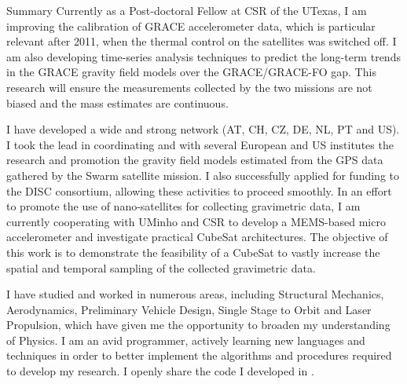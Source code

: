 \begin{cvtext}{Summary}
Currently as a Post-doctoral Fellow at \ac{CSR} of the \ac{UTexas}, I am improving the calibration of \ac{GRACE} accelerometer data, which is particular relevant after 2011, when the thermal control on the satellites was switched off.
I am also developing time-series analysis techniques to predict the long-term trends in the \ac{GRACE} gravity field models over the \ac{GRACE}/\ac{GRACE-FO} gap.
This research will ensure the measurements collected by the two missions are not biased and the mass estimates are continuous.

I have developed a wide and strong network (AT, CH, CZ, DE, NL, PT and US).
I took the lead in coordinating and with several European and US institutes the research and promotion the gravity field models estimated from the \ac{GPS} data gathered by the Swarm satellite mission.
I also successfully applied for funding to the \ac{DISC} consortium, allowing these activities to proceed smoothly.
In an effort to promote the use of nano-satellites for collecting gravimetric data, I am currently cooperating with \ac{UMinho} and CSR to develop a \ac{MEMS}-based micro accelerometer and investigate practical CubeSat architectures.
The objective of this work is to demonstrate the feasibility of a CubeSat to vastly increase the spatial and temporal sampling of the collected gravimetric data.

I have studied and worked in numerous areas, including Structural Mechanics, Aerodynamics, Preliminary Vehicle Design, Single Stage to Orbit and Laser Propulsion, which have given me the opportunity to broaden my understanding of Physics.
I am an avid programmer, actively learning new languages and techniques in order to better implement the algorithms and procedures required to develop my research.
I openly share the code I developed in .

\end{cvtext}